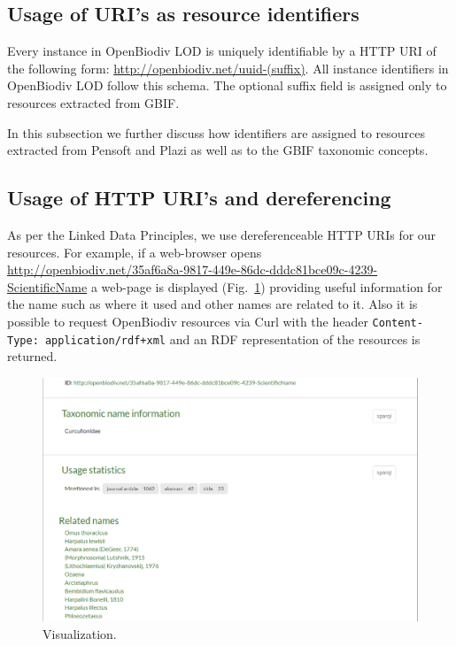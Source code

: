 \subsection{Usage of URI's as resource identifiers}

Every instance in OpenBiodiv LOD is uniquely identifiable by a HTTP URI of the following form: \url{http://openbiodiv.net/uuid-(suffix)}. All instance identifiers in OpenBiodiv LOD follow this schema. The optional suffix field is assigned only to resources extracted from GBIF.

In this subsection we further discuss how identifiers are assigned to resources extracted from Pensoft and Plazi as well as to the GBIF taxonomic concepts.

\subsection{Usage of HTTP URI's and dereferencing}

As per the Linked Data Principles, we use dereferenceable HTTP URIs for our resources. For example, if a web-browser opens\\\url{http://openbiodiv.net/35af6a8a-9817-449e-86dc-dddc81bce09c-4239-ScientificName} a web-page is displayed (Fig.~\ref{fig:portal-name-visualization}) providing useful information for the name such as where it used and other names are related to it. Also it is possible to request OpenBiodiv resources via Curl with the header {\tt Content-Type: application/rdf+xml} and an RDF representation of the resources is returned.

\begin{figure}
\centering
\includegraphics[width=\textwidth]{Figures/portal-name-visualization}
\decoRule
\caption{Visualization.}
\label{fig:portal-name-visualization}
\end{figure}

